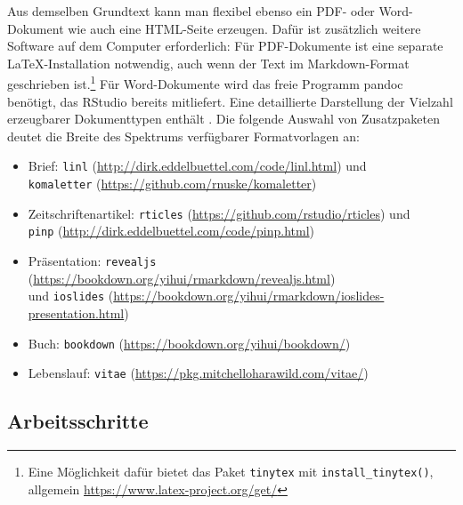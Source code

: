 Aus demselben Grundtext kann man flexibel ebenso ein PDF- oder Word-Dokument wie auch eine HTML-Seite erzeugen. Dafür ist zusätzlich weitere Software auf dem Computer erforderlich: Für PDF-Dokumente ist eine separate \LaTeX-Installation notwendig, auch wenn der Text im Markdown-Format geschrieben ist.\footnote{Eine Möglichkeit dafür bietet das Paket \lstinline!tinytex! \cite{Xie2019a, Xie2019b} mit \lstinline!install_tinytex()!,\\ allgemein \url{https://www.latex-project.org/get/}} Für Word-Dokumente wird das freie Programm pandoc \cite{McFarlane2016} benötigt, das RStudio bereits mitliefert. Eine detaillierte Darstellung der Vielzahl erzeugbarer Dokumenttypen enthält . Die folgende Auswahl von Zusatzpaketen deutet die Breite des Spektrums verfügbarer Formatvorlagen an:
\begin{itemize}
\item Brief: \lstinline!linl! (\url{http://dirk.eddelbuettel.com/code/linl.html}) und\\ \lstinline!komaletter! (\url{https://github.com/rnuske/komaletter})
\item Zeitschriftenartikel: \lstinline!rticles! (\url{https://github.com/rstudio/rticles}) und\\ \lstinline!pinp! (\url{http://dirk.eddelbuettel.com/code/pinp.html})
\item Präsentation: \lstinline!revealjs! (\url{https://bookdown.org/yihui/rmarkdown/revealjs.html})\\ und \lstinline!ioslides! (\url{https://bookdown.org/yihui/rmarkdown/ioslides-presentation.html}) 
\item Buch: \lstinline!bookdown! (\url{https://bookdown.org/yihui/bookdown/})
\item Lebenslauf: \lstinline!vitae! (\url{https://pkg.mitchelloharawild.com/vitae/})
\end{itemize}

\subsection{Arbeitsschritte}

